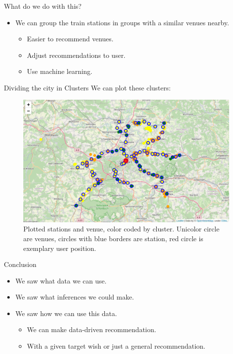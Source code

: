 \documentclass{beamer}
\begin{document}
\begin{frame}{What do we do with this?}
\begin{itemize}
\item We can group the train stations in groups with a similar venues nearby.
\begin{itemize}
\item Easier to recommend venues.
\item Adjust recommendations to user.
\item Use machine learning.
\end{itemize}
\end{itemize}
\end{frame}

\begin{frame}{Dividing the city in Clusters}
We can plot these clusters:
\begin{figure}
\centering
\includegraphics[scale=0.2]{images/spread_cluster.png}
\caption{Plotted stations and venue, color coded by cluster. Unicolor circle are venues, circles with blue borders are station, red circle is exemplary user position.}
\end{figure}
\end{frame}

\begin{frame}{Conclusion}
\begin{itemize}
\item We saw what data we can use.
\item We saw what inferences we could make.
\item We saw how we can use this data.
\begin{itemize}
\item We can make data-driven recommendation.
\item With a given target wish or just a general recommendation.
\end{itemize}
\end{itemize}
\end{frame}
\end{document}
